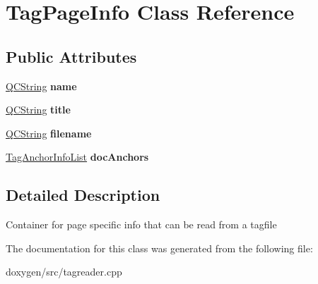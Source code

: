 \hypertarget{class_tag_page_info}{}\section{Tag\+Page\+Info Class Reference}
\label{class_tag_page_info}
\subsection*{Public Attributes}
\begin{DoxyCompactItemize}
\item 
\mbox{\label{class_tag_page_info_a2e57641a6ce6bd580af7e2b432ed7ca5}} 
\mbox{\hyperlink{class_q_c_string}{Q\+C\+String}} {\bfseries name}
\item 
\mbox{\label{class_tag_page_info_a81c788a940f2a63663938bb5d4339062}} 
\mbox{\hyperlink{class_q_c_string}{Q\+C\+String}} {\bfseries title}
\item 
\mbox{\label{class_tag_page_info_a3bf13922e2f0a86a2e23c3ccb72c84df}} 
\mbox{\hyperlink{class_q_c_string}{Q\+C\+String}} {\bfseries filename}
\item 
\mbox{\label{class_tag_page_info_a21505de00d345602f629498230a82722}} 
\mbox{\hyperlink{class_tag_anchor_info_list}{Tag\+Anchor\+Info\+List}} {\bfseries doc\+Anchors}
\end{DoxyCompactItemize}


\subsection{Detailed Description}
Container for page specific info that can be read from a tagfile 

The documentation for this class was generated from the following file\+:\begin{DoxyCompactItemize}
\item 
doxygen/src/tagreader.\+cpp\end{DoxyCompactItemize}
